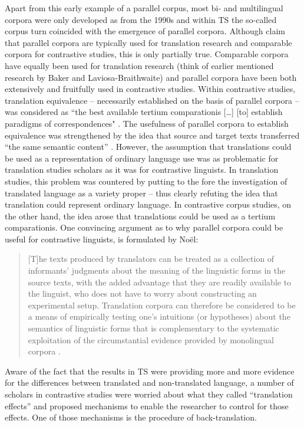 Apart from this early example of a parallel corpus, most bi- and multilingual corpora were only developed as from the 1990s \citep[19]{mcenery_corpus_2012} and within TS the so-called corpus turn coincided with the emergence of parallel corpora. Although \citet[20]{mcenery_corpus_2012} claim that parallel corpora are typically used for translation research and comparable corpora for contrastive studies, this is only partially true. Comparable corpora have equally been used for translation research (think of earlier mentioned research by Baker and Laviosa-Braithwaite) and parallel corpora have been both extensively and fruitfully used in contrastive studies. Within contrastive studies, translation equivalence – necessarily established on the basis of parallel corpora – was considered as “the best available tertium comparationis […] [to] establish paradigms of correspondences" \citep[5]{johansson_role_1998}. The usefulness of parallel corpora to establish equivalence was strengthened by the idea that source and target texts transferred “the same semantic content” \citep[19]{granger_corpus_2003}. However, the assumption that translations could be used as a representation of ordinary language use was as problematic for translation studies scholars as it was for contrastive linguists. In translation studies, this problem was countered by putting to the fore the investigation of translated language as a variety proper – thus clearly refuting the idea that translation could represent ordinary language. In contrastive corpus studies, on the other hand, the idea arose that translations could be used as a tertium comparationis. One convincing argument as to why parallel corpora could be useful for contrastive linguists, is formulated by Noël:

\begin{quote}
[T]he texts produced by translators can be treated as a collection of informants’ judgments about the meaning of the linguistic forms in the source texts, with the added advantage that they are readily available to the linguist, who does not have to worry about constructing an experimental setup. Translation corpora can therefore be considered to be a means of empirically testing one’s intuitions (or hypotheses) about the semantics of linguistic forms that is complementary to the systematic exploitation of the circumstantial evidence provided by monolingual corpora \citep[759]{noel_translations_2003}.
\end{quote}

Aware of the fact that the results in TS were providing more and more evidence for the differences between translated and non-translated language, a number of scholars in contrastive studies were worried about what they called “translation effects” \citep[6]{johansson_role_1998} and proposed mechanisms to enable the researcher to control for those effects. One of those mechanisms is the procedure of back-translation.


